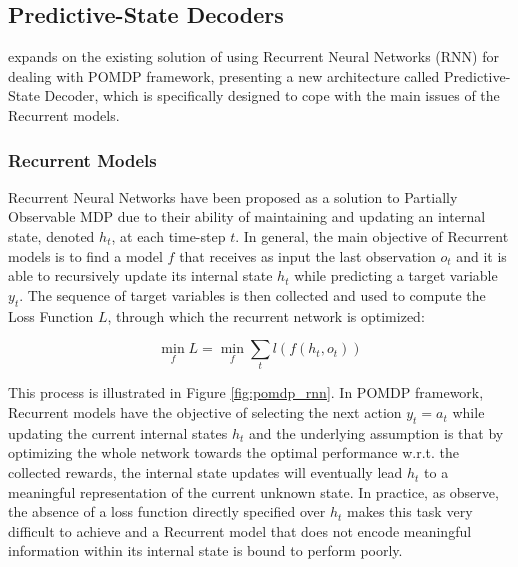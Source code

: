         \subsection{Predictive-State Decoders}
            \label{subs:psd}
             expands on the existing solution of using Recurrent Neural Networks (RNN) for dealing with POMDP framework, presenting a new architecture called Predictive-State Decoder, which is specifically designed to cope with the main issues of the Recurrent models. 
            
            \subsubsection{Recurrent Models}
                Recurrent Neural Networks have been proposed as a solution to Partially Observable MDP due to their ability of maintaining and updating an internal state, denoted $h_t$, at each time-step $t$. In general, the main objective of Recurrent models is to find a model $f$ that receives as input the last observation $o_t$ and it is able to recursively update its internal state $h_t$ while predicting a target variable $y_t$. The sequence of target variables is then collected and used to compute the Loss Function $L$, through which the recurrent network is optimized:
                
                \[ \min_{f} L = \min_{f} \sum_{t} l(f(h_t, o_t)) \]
                
                \noindent
                This process is illustrated in Figure \ref{fig:pomdp_rnn}. In POMDP framework, Recurrent models have the objective of selecting the next action $y_t = a_t$ while updating the current internal states $h_t$ and the underlying assumption is that by optimizing the whole network towards the optimal performance w.r.t. the collected rewards, the internal state updates will eventually lead $h_t$ to a meaningful representation of the current unknown state. In practice, as  observe, the absence of a loss function directly specified over $h_t$ makes this task very difficult to achieve and a Recurrent model that does not encode meaningful information within its internal state is bound to perform poorly.
                
